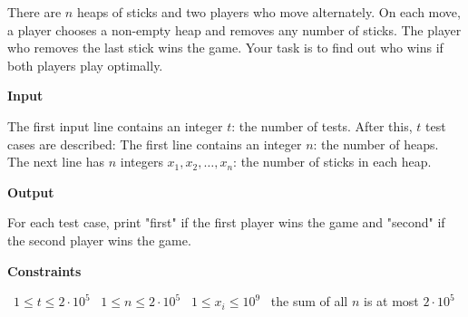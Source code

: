 There are $n$ heaps of sticks and two players who move alternately. On each move, a player chooses a non-empty heap and removes any number of sticks. The player who removes the last stick wins the game.
Your task is to find out who wins if both players play optimally.

\vspace{0.3cm}\noindent\textbf{Input}

The first input line contains an integer $t$: the number of tests. After this, $t$ test cases are described:
The first line contains an integer $n$: the number of heaps.
The next line has $n$ integers $x_1,x_2,\ldots,x_n$: the number of sticks in each heap.

\vspace{0.3cm}\noindent\textbf{Output}

For each test case, print "first" if the first player wins the game and "second" if the second player wins the game.

\vspace{0.3cm}\noindent\textbf{Constraints}

\textbullet\ $1 \le t \le 2 \cdot 10^5$
\textbullet\ $1 \le n \le 2 \cdot 10^5$
\textbullet\ $1 \le x_i \le 10^9$
\textbullet\ the sum of all $n$ is at most $2 \cdot 10^5$